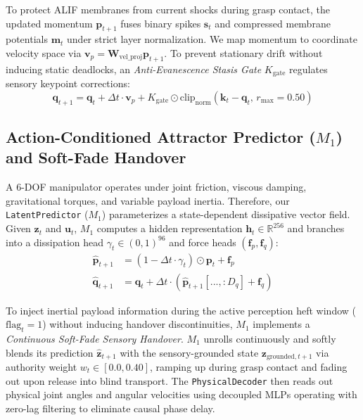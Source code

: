 \documentclass{article}
\begin{document}
To protect ALIF membranes from current shocks during grasp contact, the updated momentum $\mathbf{p}_{t+1}$ fuses binary spikes $\mathbf{s}_t$ and compressed membrane potentials $\mathbf{m}_t$ under strict layer normalization. We map momentum to coordinate velocity space via $\mathbf{v}_p = \mathbf{W}_{\text{vel\_proj}}\mathbf{p}_{t+1}$. To prevent stationary drift without inducing static deadlocks, an \textit{Anti-Evanescence Stasis Gate} $K_{\text{gate}}$ regulates sensory keypoint corrections:
\begin{equation}
\mathbf{q}_{t+1} = \mathbf{q}_t + \Delta t \cdot \mathbf{v}_p + K_{\text{gate}} \odot \text{clip}_{\text{norm}}\left(\mathbf{k}_t - \mathbf{q}_t, \, r_{\text{max}} = 0.50\right)
\end{equation}

\subsection{Action-Conditioned Attractor Predictor ($M_1$) and Soft-Fade Handover}
A 6-DOF manipulator operates under joint friction, viscous damping, gravitational torques, and variable payload inertia. Therefore, our \texttt{LatentPredictor} ($M_1$) parameterizes a state-dependent dissipative vector field. Given $\mathbf{z}_t$ and $\mathbf{u}_t$, $M_1$ computes a hidden representation $\mathbf{h}_t \in \mathbb{R}^{256}$ and branches into a dissipation head $\gamma_t \in (0,1)^{96}$ and force heads $(\mathbf{f}_p, \mathbf{f}_q)$:
\begin{align}
\hat{\mathbf{p}}_{t+1} &= (1 - \Delta t \cdot \gamma_t) \odot \mathbf{p}_t + \mathbf{f}_p \\
\hat{\mathbf{q}}_{t+1} &= \mathbf{q}_t + \Delta t \cdot \left(\hat{\mathbf{p}}_{t+1}[..., :D_q] + \mathbf{f}_q\right)
\end{align}

To inject inertial payload information during the active perception heft window ($\text{flag}_t = 1$) without inducing handover discontinuities, $M_1$ implements a \textit{Continuous Soft-Fade Sensory Handover}. $M_1$ unrolls continuously and softly blends its prediction $\hat{\mathbf{z}}_{t+1}$ with the sensory-grounded state $\mathbf{z}_{\text{grounded}, t+1}$ via authority weight $w_t \in [0.0, 0.40]$, ramping up during grasp contact and fading out upon release into blind transport. The \texttt{PhysicalDecoder} then reads out physical joint angles and angular velocities using decoupled MLPs operating with zero-lag filtering to eliminate causal phase delay.
\end{document}
